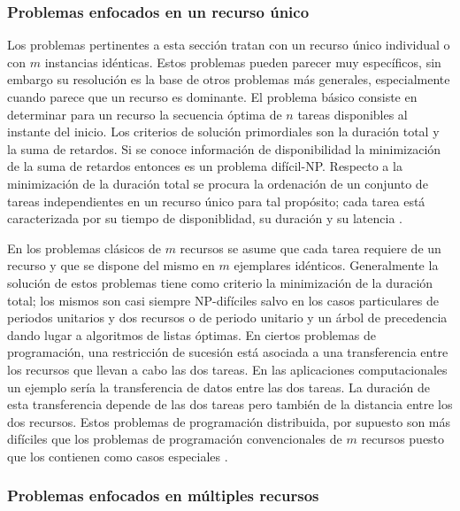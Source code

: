 \documentclass[spanish,draft,12pt,headsepline,footsepline,paper=letter]{scrreprt}
\begin{document}
\subsubsection{Problemas enfocados en un recurso único}
\label{problemas_enfocados_recurso_unico}

Los problemas pertinentes a esta sección tratan con un recurso único individual o con $m$ instancias idénticas. Estos problemas pueden parecer muy específicos, sin embargo su resolución es la base de otros problemas más generales, especialmente cuando parece que un recurso es dominante. 
%
El problema básico consiste en determinar para un recurso la secuencia óptima de $n$ tareas disponibles al instante del inicio. Los criterios de solución primordiales son la duración total y la suma de retardos. Si se conoce información de disponibilidad la minimización de la suma de retardos entonces es un problema difícil-NP. Respecto a la minimización de la duración total se procura la ordenación de un conjunto de tareas independientes en un recurso único para tal propósito; cada tarea está caracterizada por su tiempo de disponiblidad, su duración y su latencia \citep[p.~94-96]{gotha93les-problemes-dordonnancement}. 

En los problemas clásicos de $m$ recursos se asume que cada tarea requiere de un recurso y que se dispone del mismo en $m$ ejemplares idénticos. Generalmente la solución de estos problemas tiene como criterio la minimización de la duración total; los mismos son casi siempre NP-difíciles salvo en los casos particulares de periodos unitarios y dos recursos o de periodo unitario y un árbol de precedencia dando lugar a algoritmos de listas óptimas. En ciertos problemas de programación, una restricción de sucesión está asociada a una transferencia entre los recursos que llevan a cabo las dos tareas. En las aplicaciones computacionales un ejemplo sería la transferencia de datos entre las dos tareas. La duración de esta transferencia depende de las dos tareas pero también de la distancia entre los dos recursos. Estos problemas de programación distribuida, por supuesto son más difíciles que los problemas de programación convencionales de $m$ recursos puesto que los contienen como casos especiales \citep[p.~99]{gotha93les-problemes-dordonnancement}.

\subsubsection{Problemas enfocados en múltiples recursos}
\label{problemas_enfocados_multiples_recursos}
\end{document}
